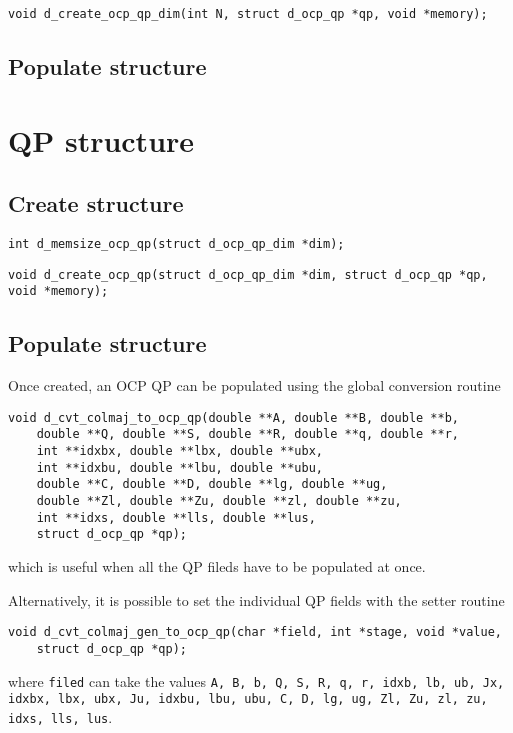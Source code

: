 \documentclass[a4paper]{report}
\begin{document}
\begin{verbatim}
void d_create_ocp_qp_dim(int N, struct d_ocp_qp *qp, void *memory);
\end{verbatim}

\subsection{Populate structure}

\section{QP structure}

\subsection{Create structure}

\begin{verbatim}
int d_memsize_ocp_qp(struct d_ocp_qp_dim *dim);
\end{verbatim}

\begin{verbatim}
void d_create_ocp_qp(struct d_ocp_qp_dim *dim, struct d_ocp_qp *qp, void *memory);
\end{verbatim}

\subsection{Populate structure}

Once created, an OCP QP can be populated using the global conversion routine
\begin{verbatim}
void d_cvt_colmaj_to_ocp_qp(double **A, double **B, double **b, 
    double **Q, double **S, double **R, double **q, double **r, 
    int **idxbx, double **lbx, double **ubx, 
    int **idxbu, double **lbu, double **ubu, 
    double **C, double **D, double **lg, double **ug, 
    double **Zl, double **Zu, double **zl, double **zu, 
    int **idxs, double **lls, double **lus,
    struct d_ocp_qp *qp);
\end{verbatim}
which is useful when all the QP fileds have to be populated at once.

Alternatively, it is possible to set the individual QP fields with the setter routine
\begin{verbatim}
void d_cvt_colmaj_gen_to_ocp_qp(char *field, int *stage, void *value,
    struct d_ocp_qp *qp);
\end{verbatim}
where {\tt filed} can take the values {\tt A, B, b, Q, S, R, q, r, idxb, lb, ub, Jx, idxbx, lbx, ubx, Ju, idxbu, lbu, ubu, C, D, lg, ug, Zl, Zu, zl, zu, idxs, lls, lus}.
\end{document}
